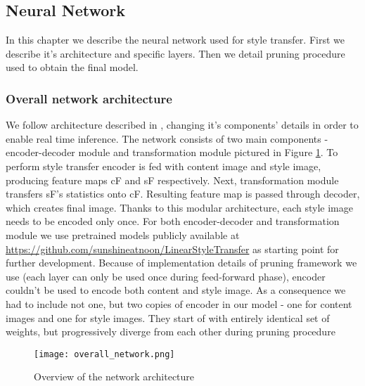 \documentclass[../Main.tex]{subfiles}
\begin{document}
    

\subsection{Neural Network} \label{network}
    In this chapter we describe the neural network used for style transfer. 
    First we describe it's architecture and specific layers. Then we detail
    pruning procedure used to obtain the final model.
    \subsubsection{Overall network architecture} 
    We follow architecture described in \cite{Li2018}, changing it's components' details 
    in order to enable real time inference. The network consists of two 
    main components - encoder-decoder module and
    transformation module pictured in Figure \ref{fig:overall_network}.
    To perform style transfer encoder is fed with content image
    and style image, producing feature maps cF and sF respectively.
    Next, transformation module transfers sF's statistics onto cF. Resulting 
    feature map is passed through decoder, which creates final image. 
    Thanks to this modular architecture, each style image needs to be encoded
    only once. For both encoder-decoder and
    transformation module we use pretrained models publicly available at 
    \url{https://github.com/sunshineatnoon/LinearStyleTransfer}
    as starting point for further development. Because of implementation details
    of pruning framework we use (each layer can only be used once during 
    feed-forward phase), encoder couldn't be used to encode both content and
    style image. As a consequence we had to include not one, but two copies of encoder
    in our model - one for content images and one for style images. They start of
    with entirely identical set of weights, but progressively diverge from each 
    other during pruning procedure
    
    \begin{figure}[h!]
        \texttt{[image: overall\_network.png]}
        \caption{Overview of the network architecture}
        \label{fig:overall_network}
    \end{figure}
    
    
\end{document}
